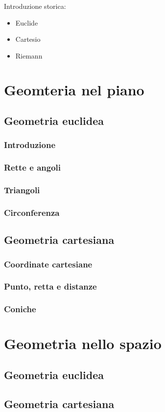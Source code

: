
Introduzione storica:
\begin{itemize}
  \item Euclide
  \item Cartesio
  \item Riemann
\end{itemize}

\chapter{Geomteria nel piano}
\section{Geometria euclidea}
\subsection{Introduzione}
\subsection{Rette e angoli}
\subsection{Triangoli}
\subsection{Circonferenza}

\section{Geometria cartesiana}
\subsection{Coordinate cartesiane}
\subsection{Punto, retta e distanze}
\subsection{Coniche}

\chapter{Geometria nello spazio}
\section{Geometria euclidea}
\section{Geometria cartesiana}


